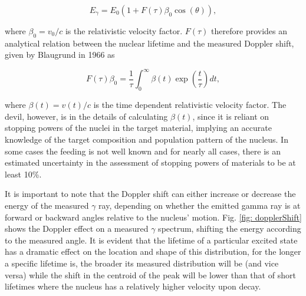 \begin{equation}
E_{\gamma} = E_{0} \left(1 + F(\tau) \beta_{0} \cos (\theta)   \right),
\label{eqn: dopplerFull}
\end{equation}

\noindent where $\beta_{0} = v_{0}/c$ is the relativistic velocity factor. $F(\tau)$ therefore provides an analytical relation between the nuclear lifetime and the measured Doppler shift, given by Blaugrund in 1966 \cite{Blaugrund1966} as

\begin{equation}
F(\tau) \beta_{0} = \dfrac{1}{\tau} \int_{0}^{\infty} \beta(t) \exp \left( \dfrac{t}{\tau} \right) dt,
\end{equation} 

\noindent where $\beta(t) = v(t)/c$ is the time dependent relativistic velocity factor. The devil, however, is in the details of calculating $\beta(t)$, since it is reliant on stopping powers of the nuclei in the target material, implying an accurate knowledge of the target composition and population pattern of the nucleus. In some cases the feeding is not well known and for nearly all cases, there is an estimated uncertainty in the assessment of stopping powers of materials to be at least 10\%.

It is important to note that the Doppler shift can either increase or decrease the energy of the measured $\gamma$ ray, depending on whether the emitted gamma ray is at forward or backward angles relative to the nucleus' motion. Fig. \ref{fig: dopplerShift} shows the Doppler effect on a measured $\gamma$ spectrum, shifting the energy according to the measured angle. It is evident that the lifetime of a particular excited state has a dramatic effect on the location and shape of this distribution, for the longer a specific lifetime is, the broader its measured distribution will be (and vice versa) while the shift in the centroid of the peak will be lower than that of short lifetimes where the nucleus has a relatively higher velocity upon decay. 

